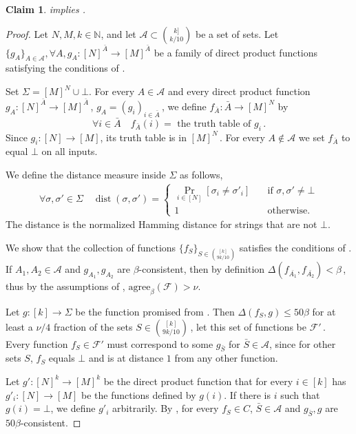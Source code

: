 \documentclass[11pt]{article}
\numberwithin{equation}{section}
\newtheorem{claim}[theorem]{Claim}
\theoremstyle{definition}
\theoremstyle{plain}
\newcommand{\set}[1]{\{#1\}} %
\newcommand\f{f} %
\newcommand\setf{f} %
\newcommand{\g}{g} %
\newcommand\rest[1]{{\bar{#1}}}  %
\DeclareMathOperator{\dist}{dist} %
\newcommand{\diff}{\Delta} %
\begin{document}
\begin{claim}
 implies
.
\end{claim}
\begin{proof}
Let $N,M,k\in\mathbb{N}$, and let $\mathcal{A}\subset \binom{k]}{k/10}$ be a 
%
set %
of sets. Let $\set{\g_A}_{A\in\mathcal{A}}, \forall A, \g_A:[N]^{\rest{A}}\rightarrow [M]^{\rest{A}}$ be a family of direct product functions satisfying the conditions of .

Set $\Sigma = [M]^{N}\cup \bot$.
For every $A\in\mathcal{A}$ and every direct product function $\g_A:[N]^{\rest{A}}\rightarrow [M]^{\rest{A}}$\,, $\g_A = (\g_i)_{i\in\rest{A}}$\,, we define $\setf_{\rest{A}}:\rest{A}\rightarrow [M]^{N}$ by
\[ \forall i \in \rest{A} \quad \setf_{\rest{A}}(i) = \textrm{ the truth table of }\g_i\,. \]%
Since $g_i:[N]\rightarrow [M]$, its truth table is in $[M]^{N}$\,.
For every $A\notin \mathcal{A}$ we set $\f_{\rest{A}}$ to equal $\bot$ on all inputs.

We define the distance measure inside $\Sigma$ as follows, 
\begin{align*}
   \forall \sigma,\sigma'\in\Sigma \quad \dist(\sigma,\sigma') = 
   \begin{cases}
 \Pr_{i\in [N]}[\sigma_i \neq \sigma'_i] \quad &\textrm{if }\sigma,\sigma'\neq\bot\\
1 \quad &\textrm{otherwise.}
\end{cases} 
\end{align*}
The distance is the normalized Hamming distance for strings that are not $\bot$.

We show that the collection of functions $\set{\f_S}_{S\in\binom{[k]}{9k/10}}$ satisfies the conditions of . If  $A_1,A_2\in\mathcal{A}$ and $\g_{A_1},\g_{A_2}$ are $\beta$-consistent, then by definition $\Delta(\f_{\rest{A_1}},\f_{\rest{A_2}}) < \beta$\,, thus by the assumptions of ,   $\text{agree}_\beta(\mathcal{F})> \nu$.

Let $\g:[k]\rightarrow \Sigma$ be the function promised from . Then $\diff(\setf_S,\g) \leq 50\beta$ for at least a 
%
$\nu/4$ %
%
%
fraction  %
of the sets $S\in\binom{[k]}{9k/10}$\,, let this set of functions be $\mathcal{F}'$\,. Every function $\f_S\in \mathcal{F}'$  must correspond to some $\g_{\rest{S}}$ for $\rest{S}\in\mathcal{A}$, since for other sets $S$, $\f_S$ equals $\bot$  and is at distance $1$ from any other function. 

Let $\g':[N]^k\rightarrow[M]^k$ be the direct product function that for every $i\in [k]$ has $\g'_i:[N]\rightarrow[M]$ be the functions defined by $\g(i)$. If there is $i$ such that $\g(i)=\bot$, we define $\g'_i$ arbitrarily. By , for every $\f_S\in C$, $\rest{S}\in\mathcal{A}$ and $\g_{\rest{S}},\g$ are $50\beta$-consistent.
%
%
\end{proof}
\end{document}
